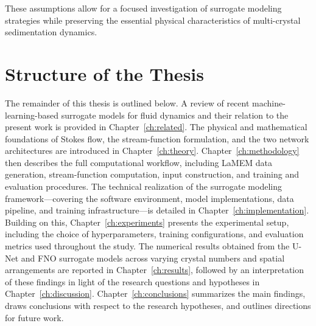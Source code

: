 These assumptions allow for a focused investigation of surrogate modeling strategies while preserving the essential physical characteristics of multi-crystal sedimentation dynamics.

\section{Structure of the Thesis}

The remainder of this thesis is outlined below.
A review of recent machine-learning-based surrogate models for fluid dynamics and their relation to the present work is provided in Chapter~\ref{ch:related}.
The physical and mathematical foundations of Stokes flow, the stream-function formulation, and the two network architectures are introduced in Chapter~\ref{ch:theory}.
Chapter~\ref{ch:methodology} then describes the full computational workflow, including LaMEM data generation, stream-function computation, input construction, and training and evaluation procedures.
The technical realization of the surrogate modeling framework—covering the software environment, model implementations, data pipeline, and training infrastructure---is detailed in Chapter~\ref{ch:implementation}.
Building on this, Chapter~\ref{ch:experiments} presents the experimental setup, including the choice of hyperparameters, training configurations, and evaluation metrics used throughout the study.
The numerical results obtained from the U-Net and FNO surrogate models across varying crystal numbers and spatial arrangements are reported in Chapter~\ref{ch:results}, followed by an interpretation of these findings in light of the research questions and hypotheses in Chapter~\ref{ch:discussion}.
Chapter~\ref{ch:conclusions} summarizes the main findings, draws conclusions with respect to the research hypotheses, and outlines directions for future work.


